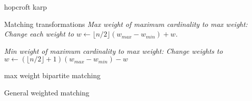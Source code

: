 
\begin{algorithm}{hopcroft karp}
\end{algorithm}


\begin{algorithm}{Matching transformations}
\desc
\em Max weight of maximum cardinality to max weight: \em
Change each weight to $w \leftarrow \lfloor n/2 \rfloor (w_{max}-w_{min}) + w$.

\em Min weight of maximum cardinality to max weight: \em
Change weights to $w \leftarrow (\lfloor n/2 \rfloor + 1)(w_{max}-w_{min}) -
w$

\end{algorithm}

\begin{algorithm}{max weight bipartite matching}
\end{algorithm}





\begin{algorithm}{General weighted matching}
\end{algorithm}
